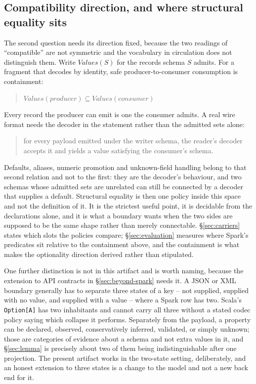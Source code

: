 \subsection{Compatibility direction, and where structural equality sits}
\label{sec:direction}

The second question needs its direction fixed, because the two readings of ``compatible'' are not symmetric and the vocabulary in circulation does not distinguish them. Write $\mathit{Values}(S)$ for the records schema $S$ admits. For a fragment that decodes by identity, safe producer-to-consumer consumption is containment:
\begin{quote}
$\mathit{Values}(\mathit{producer}) \subseteq \mathit{Values}(\mathit{consumer})$
\end{quote}
Every record the producer can emit is one the consumer admits. A real wire format needs the decoder in the statement rather than the admitted sets alone:
\begin{quote}
for every payload emitted under the writer schema, the reader's decoder accepts it and yields a value satisfying the consumer's schema.
\end{quote}
Defaults, aliases, numeric promotion and unknown-field handling belong to that second relation and not to the first: they are the decoder's behaviour, and two schemas whose admitted sets are unrelated can still be connected by a decoder that supplies a default. Structural equality is then one policy inside this space and not the definition of it. It is the strictest useful point, it is decidable from the declarations alone, and it is what a boundary wants when the two sides are supposed to be the same shape rather than merely connectable. \S\ref{sec:carriers} states which slots the policies compare; \S\ref{sec:evaluation} measures where Spark's predicates sit relative to the containment above, and the containment is what makes the optionality direction derived rather than stipulated.

One further distinction is not in this artifact and is worth naming, because the extension to API contracts in \S\ref{sec:beyond-spark} needs it. A JSON or XML boundary generally has to separate three states of a key -- not supplied, supplied with no value, and supplied with a value -- where a Spark row has two. Scala's \texttt{Option[A]} has two inhabitants and cannot carry all three without a stated codec policy saying which collapse it performs. Separately from the payload, a property can be declared, observed, conservatively inferred, validated, or simply unknown; those are categories of evidence about a schema and not extra values in it, and \S\ref{sec:lemma} is precisely about two of them being indistinguishable after one projection. The present artifact works in the two-state setting, deliberately, and an honest extension to three states is a change to the model and not a new back end for it.


